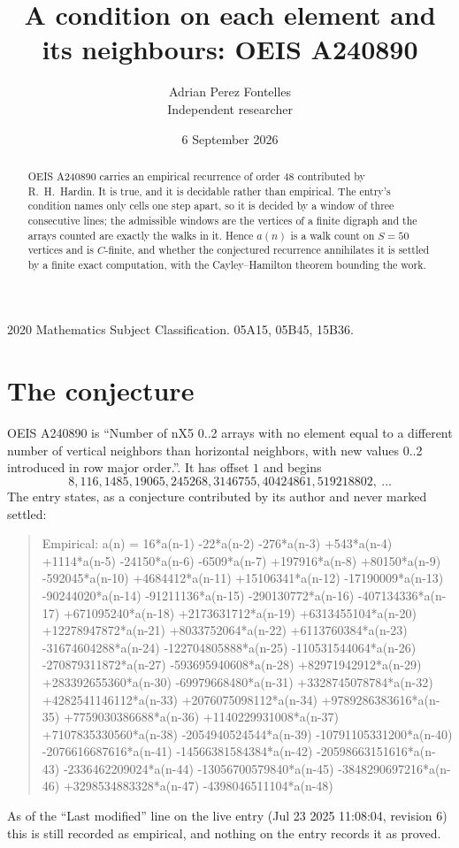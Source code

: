 \documentclass[11pt,a4paper]{article}
\title{A condition on each element and its neighbours: OEIS A240890}
\author{Adrian Perez Fontelles\\ \small Independent researcher}
\date{6 September 2026}
\theoremstyle{plain}
\theoremstyle{definition}
\begin{document}
\maketitle

\begin{abstract}
OEIS A240890 carries an empirical recurrence of order $48$ contributed by R.~H.~Hardin. It is
true, and it is decidable rather than empirical. The entry's condition names only cells one step apart, so it is decided by a window of
three consecutive lines; the
admissible windows are the vertices of a finite digraph and the arrays counted are exactly the
walks in it. Hence $a(n)$ is a walk count on $S=50$ vertices and is $C$-finite, and whether the
conjectured recurrence annihilates it is settled by a finite exact computation, with the
Cayley--Hamilton theorem bounding the work.
\end{abstract}

\noindent\small 2020 Mathematics Subject Classification. 05A15, 05B45, 15B36.\normalsize

\section{The conjecture}

OEIS A240890 is ``Number of nX5 0..2 arrays with no element equal to a different number of vertical neighbors than horizontal neighbors, with new values 0..2 introduced in row major order.''. It has offset $1$ and begins
\[
8, 116, 1485, 19065, 245268, 3146755, 40424861, 519218802,\ \dots
\]
The entry states, as a conjecture contributed by its author and never marked settled:
\begin{quote}
Empirical: a(n) = 16*a(n-1) -22*a(n-2) -276*a(n-3) +543*a(n-4) +1114*a(n-5) -24150*a(n-6) -6509*a(n-7) +197916*a(n-8) +80150*a(n-9) -592045*a(n-10) +4684412*a(n-11) +15106341*a(n-12) -17190009*a(n-13) -90244020*a(n-14) -91211136*a(n-15) -290130772*a(n-16) -407134336*a(n-17) +671095240*a(n-18) +2173631712*a(n-19) +6313455104*a(n-20) +12278947872*a(n-21) +8033752064*a(n-22) +6113760384*a(n-23) -31674604288*a(n-24) -122704805888*a(n-25) -110531544064*a(n-26) -270879311872*a(n-27) -593695940608*a(n-28) +82971942912*a(n-29) +283392655360*a(n-30) -69979668480*a(n-31) +3328745078784*a(n-32) +4282541146112*a(n-33) +2076075098112*a(n-34) +9789286383616*a(n-35) +7759030386688*a(n-36) +1140229931008*a(n-37) +7107835330560*a(n-38) -2054940524544*a(n-39) -10791105331200*a(n-40) -2076616687616*a(n-41) -14566381584384*a(n-42) -20598663151616*a(n-43) -2336462209024*a(n-44) -13056700579840*a(n-45) -3848290697216*a(n-46) +3298534883328*a(n-47) -4398046511104*a(n-48)
\end{quote}
As of the ``Last modified'' line on the live entry (Jul 23 2025 11:08:04, revision 6) this is still
recorded as empirical, and nothing on the entry records it as proved.
\end{document}
